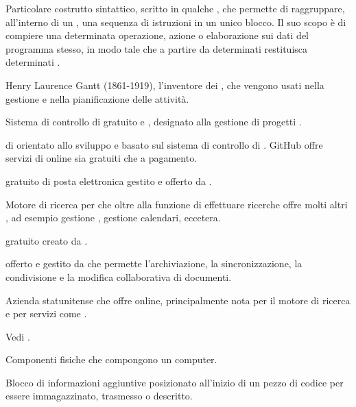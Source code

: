 {Particolare costrutto sintattico, scritto in qualche , che permette di raggruppare, all'interno di un , una sequenza di istruzioni in un unico blocco. Il suo scopo è di compiere una determinata operazione, azione o elaborazione sui dati del programma stesso, in modo tale che a partire da determinati  restituisca determinati .}




{Henry Laurence Gantt (1861-1919), l'inventore dei , che vengono usati nella gestione e nella pianificazione delle attività.}

{Sistema di controllo di   gratuito e , designato alla gestione di progetti .}

{ di   orientato allo sviluppo  e basato sul sistema di controllo di  . GitHub offre servizi di  online sia gratuiti che a pagamento.}

{ gratuito di posta elettronica gestito e offerto da .}

{Motore di ricerca per  che oltre alla funzione di effettuare ricerche offre molti altri , ad esempio gestione , gestione calendari, eccetera.} 

{ gratuito creato da .}

{ offerto e gestito da  che permette l'archiviazione, la sincronizzazione, la condivisione e la modifica collaborativa di documenti.}

{Azienda statunitense che offre  online, principalmente nota per il motore di ricerca  e per servizi come .}

{Vedi .}




{Componenti fisiche che compongono un computer.}

{Blocco di informazioni aggiuntive posizionato all'inizio di un pezzo di codice per essere immagazzinato, trasmesso o descritto.}

